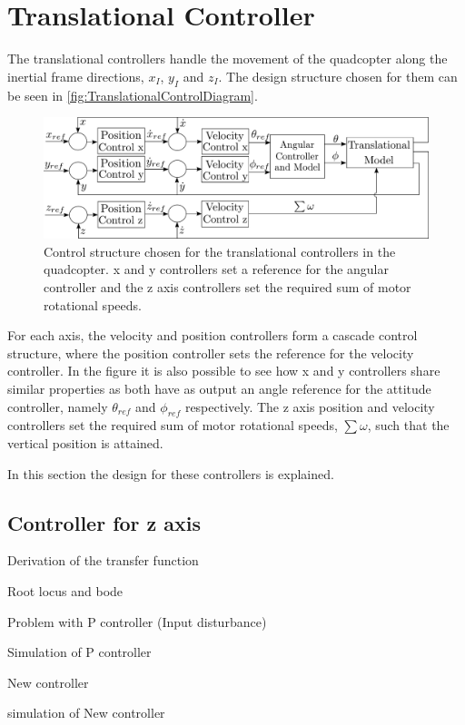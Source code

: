 \section{Translational Controller} \label{sec:TranslationalController}

The translational controllers handle the movement of the quadcopter along the inertial frame directions, $x_I$, $y_I$ and $z_I$. The design structure chosen for them can be seen in \autoref{fig:TranslationalControlDiagram}.
\begin{figure}[H]
	\centering
	\includegraphics[scale=0.3]{figures/TranslationalControlDiagram}
	\caption{Control structure chosen for the translational controllers in the quadcopter. x and y controllers set a reference for the angular controller and the z axis controllers set the required sum of motor rotational speeds.}
	\label{fig:TranslationalControlDiagram}
\end{figure}
For each axis, the velocity and position controllers form a cascade control structure, where the position controller sets the reference for the velocity controller. In the figure it is also possible to see how x and y controllers share similar properties as both have as output an angle reference for the attitude controller, namely $\theta_{ref}$ and $\phi_{ref}$ respectively. 
The z axis position and velocity controllers set the required sum of motor rotational speeds, $\sum\omega$, such that the vertical position is attained.

In this section the design for these controllers is explained.
\subsection{Controller for z axis}
Derivation of the transfer function 

Root locus and bode

Problem with P controller (Input disturbance)

Simulation of P controller

New controller 

simulation of New controller

